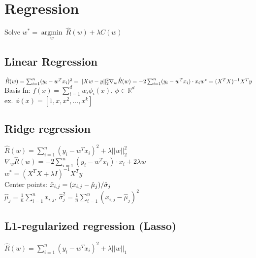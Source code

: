 \section*{Regression}

Solve $w^* = \underset{w}{\operatorname{argmin}} ~ \hat{R}(w)+ \lambda C(w)$

\subsection*{Linear Regression}

$\hat{R}(w) = \sum_{i=1}^n (y_i - w^Tx_i)^2 = ||Xw-y||^2_2\\
\nabla_w \hat{R}(w) = -2 \sum_{i=1}^n (y_i-w^T x_i) \cdot x_i \\
w^* = (X^T X)^{-1} X^T y$\\
Basis fn: $f(x)=\sum_{i=1}^dw_i\phi_i(x)$, $\phi\in\mathbb{R}^d$\\
ex. $\phi(x) = [1,x,x^2,...,x^k]$

\subsection*{Ridge regression}

$\hat{R}(w) = \sum_{i=1}^n (y_i - w^Tx_i)^2 + \lambda ||w||_2^2$\\
$\nabla_w \hat{R}(w) = -2 \sum_{i=1}^n (y_i-w^T x_i) \cdot x_i + 2 \lambda w$\\
$w^*=(X^T X + \lambda I)^{-1} X^T y$\\
Center points: $\Tilde{x}_{i,j} = (x_{i,j} - \hat{\mu}_j)/\hat{\sigma}_j$\\
$\hat{\mu}_j = \frac{1}{n}\sum_{i=1}^nx_{i,j}$, $\hat{\sigma}^2_j=\frac{1}{n}\sum_{i=1}^n(x_{i,j}-\hat{\mu}_j)^2$

\subsection*{L1-regularized regression (Lasso)}
$\hat{R}(w) = \sum_{i=1}^n (y_i - w^Tx_i)^2 + \lambda ||w||_1$